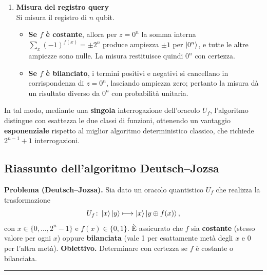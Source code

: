 \documentclass[a4paper,12pt]{report}
\theoremstyle{plain}
\begin{document}
\begin{enumerate}
    \item \textbf{Misura del registro query} \\
    Si misura il registro di $n$ qubit.
    
    \begin{itemize}
        \item \textbf{Se $f$ è costante}, allora per $z=0^n$ la somma interna
        $\sum_x(-1)^{f(x)} = \pm 2^n$ produce ampiezza $\pm 1$ per $\ket{0^n}$, e tutte le altre ampiezze sono nulle. La misura restituisce quindi $0^n$ con certezza.
        
        \item \textbf{Se $f$ è bilanciato}, i termini positivi e negativi si cancellano in corrispondenza di $z=0^n$, lasciando ampiezza zero; pertanto la misura dà un risultato diverso da $0^n$ con probabilità unitaria.
    \end{itemize}
\end{enumerate}
In tal modo, mediante una \textbf{singola} interrogazione dell'oracolo $U_f$, l'algoritmo distingue con esattezza le due classi di funzioni, ottenendo un vantaggio \textbf{esponenziale} rispetto al miglior algoritmo deterministico classico, che richiede $2^{n-1}+1$ interrogazioni.
\subsection*{Riassunto dell'algoritmo Deutsch--Jozsa}
\textbf{Problema (Deutsch--Jozsa).}
Sia dato un oracolo quantistico $U_f$ che realizza la trasformazione
\[
U_f\colon \ket{x}\ket{y} \longmapsto \ket{x}\ket{y \oplus f(x)},
\]
con $x\in\{0,\dots,2^n-1\}$ e $f(x)\in\{0,1\}$. È assicurato che $f$ sia \textbf{costante} (stesso valore per ogni $x$) oppure \textbf{bilanciata} (vale 1 per esattamente metà degli $x$ e 0 per l'altra metà).
\textbf{Obiettivo.}
Determinare con certezza se $f$ è costante o bilanciata.
\vspace{0.5em}\hrule\vspace{0.5em}
\end{document}
